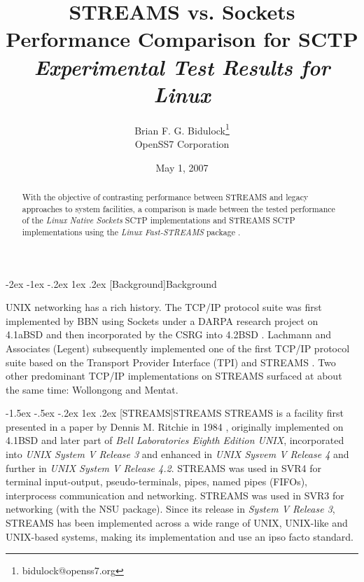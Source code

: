 \documentclass[letterpaper,final,notitlepage,twocolumn,10pt,twoside]{article}
\makeatletter
\renewcommand\section{\@startsection {section}{1}{\z@}%
                                   {-2ex \@plus -1ex \@minus -.2ex}%
                                   {1ex \@plus .2ex}%
                                   {\normalfont\large\bfseries}}
\renewcommand\subsection{\@startsection{subsection}{2}{\z@}%
                                     {-1.5ex \@plus -.5ex \@minus -.2ex}%
                                     {1ex \@plus .2ex}%
                                     {\normalfont\normalsize\bfseries}}
\makeatother
\begin{document}

\title{STREAMS vs. Sockets Performance Comparison for SCTP\\[0.5ex]
	{\large \textsl{Experimental Test Results for Linux}}}
\author{Brian F. G. Bidulock\thanks{bidulock@openss7.org}\\
	OpenSS7 Corporation}
\date{May 1, 2007}
\maketitle

\begin{abstract}
With the objective of contrasting performance between STREAMS and legacy
approaches to system facilities, a comparison is made between the tested
performance of the \textsl{Linux Native Sockets} SCTP implementations and STREAMS SCTP
implementations using the \textsl{Linux Fast-STREAMS}
package \cite[]{LfS}.
\end{abstract}


\section[Background]{Background}

UNIX networking has a rich history.  The TCP/IP protocol suite was first
implemented by BBN using Sockets under a DARPA research project on 4.1aBSD and
then incorporated by the CSRG into 4.2BSD \cite[]{bsd}.  Lachmann and
Associates (Legent) subsequently implemented one of the first TCP/IP protocol
suite based on the Transport Provider Interface (TPI) \cite[]{tli} and STREAMS
\cite[]{magic}.  Two other predominant TCP/IP implementations on STREAMS
surfaced at about the same time: Wollongong and Mentat.

\subsection[STREAMS]{STREAMS}
STREAMS is a facility first presented in a paper by Dennis M. Ritchie in 1984
\cite[]{Ritchie84}, originally implemented on 4.1BSD and later part of
\textsl{Bell Laboratories Eighth Edition UNIX}, incorporated into \textsl{UNIX
System V Release 3} and enhanced in \textsl{UNIX Sysvem V Release 4} and
further in \textsl{UNIX System V Release 4.2}.  STREAMS was used in SVR4 for
terminal input-output, pseudo-terminals, pipes, named pipes (FIFOs),
interprocess communication and networking.  STREAMS was used in SVR3 for
networking (with the NSU package).  Since its release in \textsl{System V
Release 3}, STREAMS has been implemented across a wide range of UNIX,
UNIX-like and UNIX-based systems, making its implementation and use an ipso
facto standard.
\end{document}

